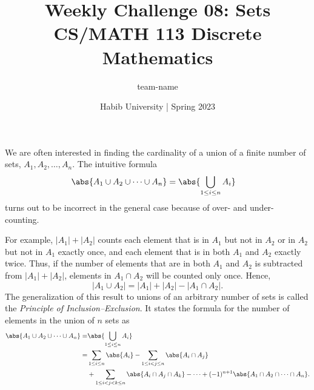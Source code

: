 \documentclass[a4paper]{exam}
\title{Weekly Challenge 08: Sets\\CS/MATH 113 Discrete Mathematics}
\author{team-name}  %
\date{Habib University | Spring 2023}
\begin{document}
\maketitle

\begin{questions}


  We are often interested in finding the cardinality of a union of a finite number of sets, $A_1,A_2,\ldots,A_n$. The intuitive formula
  \begin{align}
    \label{eq:wrong}
    \abs{A_1\cup A_2 \cup \dots \cup A_n} & = \abs{\bigcup_{1\leq i \leq n}A_i}
  \end{align}
  turns out to be incorrect in the general case because of over- and under- counting.
  
  For example, $|A_1| + |A_2|$ counts each element that is in $A_1$ but not in $A_2$ or in $A_2$ but not in $A_1$ exactly once, and each element that is in both $A_1$ and $A_2$ exactly twice. Thus, if the number of elements that are in both $A_1$ and $A_2$ is subtracted from $|A_1| + |A_2|$, elements in $A_1 \cap A_2$ will be counted only once. Hence,
  \[
    |A_1 \cup A_2| = |A_1| + |A_2| - |A_1 \cap A_2|.
  \]
  The generalization of this result to unions of an arbitrary number of sets is called the \textit{Principle of Inclusion–Exclusion}. It states the formula for the number of elements in the union of $n$ sets as
  \begin{align}
    \abs{A_1\cup A_2 \cup \dots \cup A_n} =&  \abs{\bigcup_{1\leq i \leq n}A_i} \nonumber \\ 
    =&  \sum_{1 \leq i \leq n}{\abs{A_i}} - \sum_{1\leq i < j \leq n}{\abs{A_i \cap A_j}} \nonumber   \\
                                           & + \sum_{1\leq i < j < k \leq n}{\abs{A_i \cap A_j \cap A_k}} - \dots + (-1)^{n+1}\abs{A_1 \cap A_2 \cap \dots \cap A_n}.     \label{eq:right}
  \end{align}
  
\end{questions}
\end{document}
